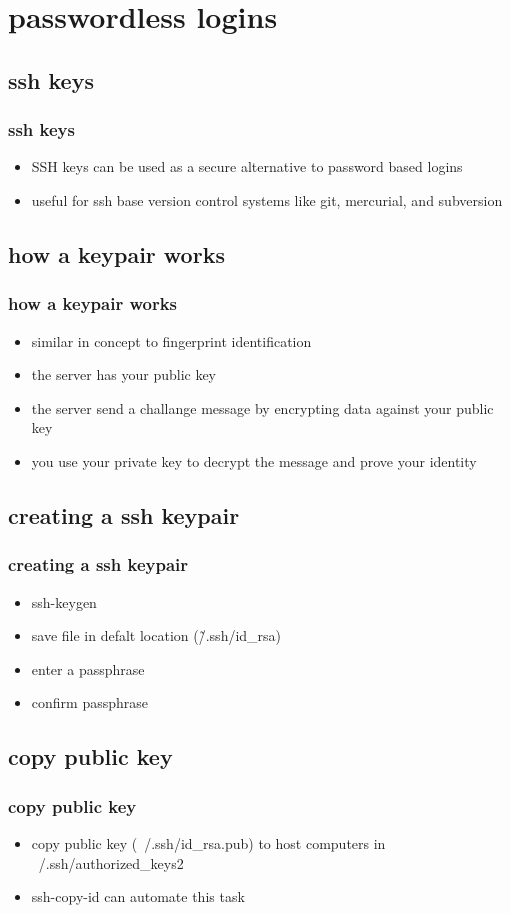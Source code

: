 \documentclass[hyperref={pdfpagelabels=false}]{beamer}
\begin{document}
\section{passwordless logins}
\subsection{ssh keys}
\frame
{
    \frametitle{ssh keys}
    \begin{itemize}
    \item{SSH keys can be used as a secure alternative to password based logins}
    \item{useful for ssh base version control systems like git, mercurial, and subversion}
    \end{itemize}
}
\subsection{how a keypair works}
\frame
{
    \frametitle{how a keypair works}
    \begin{itemize}
    \item{similar in concept to fingerprint identification}
    \item{the server has your public key}
    \item{the server send a challange message by encrypting data against your public key}
    \item{you use your private key to decrypt the message and prove your identity}
    \end{itemize}
}
\subsection{creating a ssh keypair}
\frame
{
    \frametitle{creating a ssh keypair}
    \begin{itemize}
    \item{ssh-keygen}
    \item{save file in defalt location (\~/.ssh/id\_rsa)}
    \item{enter a passphrase}
    \item{confirm passphrase}
    \end{itemize}
}
\subsection{copy public key}
\frame
{
    \frametitle{copy public key}
    \begin{itemize}
    \item{copy public key (~/.ssh/id\_rsa.pub) to host computers in ~/.ssh/authorized\_keys2}
    \item{ssh-copy-id can automate this task}
    \end{itemize}
}
\end{document}
